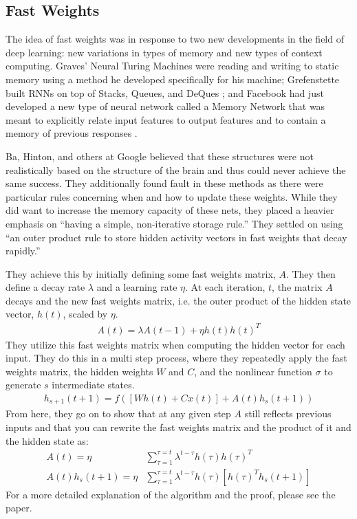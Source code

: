 \documentclass{article}
\begin{document}
\subsection{Fast Weights}
The idea of fast weights was in response to two new developments in the field of
deep learning: new variations in types of memory and new types of context computing.
Graves' Neural Turing Machines \cite{Graves14} were reading and writing to static memory using
a method he developed specifically for his machine; Grefenstette built RNNs on top of
Stacks, Queues, and DeQues \cite{GrefenstetteHSB15}; and Facebook had just developed
a new type of neural network called a Memory Network that was meant to explicitly
relate input features to output features and to contain a memory of previous responses \cite{WestonCB14}.

Ba, Hinton, and others at Google  believed that these structures were not realistically based on the
structure of the brain and thus could never achieve the same success. They additionally
found fault in these methods as there were particular rules concerning when
and how to update these weights. While they did want to increase the memory capacity
of these nets, they placed a heavier emphasis on ``having a simple, non-iterative storage rule.''
They settled on using ``an outer product rule to store hidden activity vectors in fast weights that decay rapidly.''

They achieve this by initially defining some fast weights matrix, $A$. They then
define a decay rate $\lambda$ and a learning rate $\eta$. At each iteration, $t$, the matrix $A$ decays and
the new fast weights matrix, i.e. the outer product of the hidden state vector, $h(t)$, scaled by $\eta$.
\begin{align}
  A(t) = \lambda A(t-1) + \eta h(t)h(t)^T
\end{align}
They utilize this fast weights matrix when computing the hidden vector for each input.
They do this in a multi step process, where they repeatedly apply the fast weights
matrix, the hidden weights $W$ and $C$, and the nonlinear function $\sigma$ to generate $s$ intermediate states.
\begin{align}
  h_{s+1}(t+1) = f([Wh(t) + Cx(t)] + A(t)h_s(t+1))
\end{align}
From here, they go on to show that at any given step $A$ still reflects previous
inputs and that you can rewrite the fast weights matrix and the product of it and the hidden state as:
\begin{align}
  A(t) = \eta & \sum^{\tau=t}_{\tau = 1}\lambda^{t-\tau}h(\tau)h(\tau)^T\\
  A(t)h_s(t+1) = \eta & \sum^{\tau = t}_{\tau = 1}\lambda^{t-\tau}h(\tau)[h(\tau)^Th_s(t+1)]
\end{align}
For a more detailed explanation of the algorithm and the proof, please see the paper.
\end{document}

